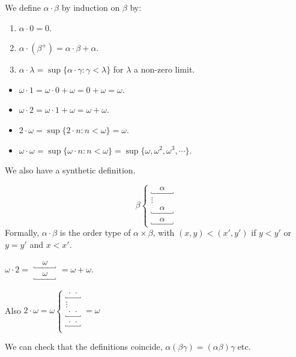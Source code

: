 \documentclass[a4paper]{article}
\begin{document}
\begin{defi}
  We define $\alpha\cdot \beta$ by induction on $\beta$ by:
  \begin{enumerate}
    \item $\alpha\cdot 0 = 0$.
    \item $\alpha\cdot (\beta^+) = \alpha\cdot \beta + \alpha$.
    \item $\alpha\cdot \lambda = \sup\{\alpha\cdot \gamma: \gamma < \lambda\}$ for $\lambda$ a non-zero limit.
  \end{enumerate}
\end{defi}

\begin{eg}\leavevmode
  \begin{itemize}
    \item $\omega \cdot 1 = \omega\cdot 0 + \omega = 0 + \omega = \omega$.
    \item $\omega \cdot 2 = \omega \cdot 1 + \omega = \omega + \omega$.
    \item $2\cdot \omega = \sup\{2\cdot n: n < \omega\} = \omega$.
    \item $\omega\cdot \omega = \sup \{\omega\cdot n: n < \omega\} = \sup\{\omega, \omega^2, \omega^3, \cdots\}$.
  \end{itemize}
\end{eg}

We also have a synthetic definition.
\begin{defi}
  \[
    \beta\left\{
      \begin{array}{c}
        \underbracket{\quad\alpha\quad} \\
        \vdots \\
        \underbracket{\quad\alpha\quad} \\
        \underbracket{\quad\alpha\quad}
      \end{array}\right.
    \]
  Formally, $\alpha\cdot \beta$ is the order type of $\alpha\times \beta$, with $(x, y) < (x', y')$ if $y < y'$ or $y = y'$ and $x < x'$.
\end{defi}

\begin{eg}
  $\displaystyle\omega\cdot 2 =
  \begin{array}{c}
    \underbracket{\quad\omega\quad}\\
    \underbracket{\quad\omega\quad}
  \end{array} = \omega + \omega$.

  Also $2\cdot \omega = \omega\left\{
  \begin{array}{c}
        \underbracket{\,\cdot\,\cdot\,} \\
        \vdots \\
        \underbracket{\,\cdot\,\cdot\,} \\
        \underbracket{\,\cdot\,\cdot\,} \\
      \end{array}\right. = \omega$
\end{eg}
We can check that the definitions coincide, $\alpha(\beta\gamma) = (\alpha\beta)\gamma$ etc.
\end{document}
